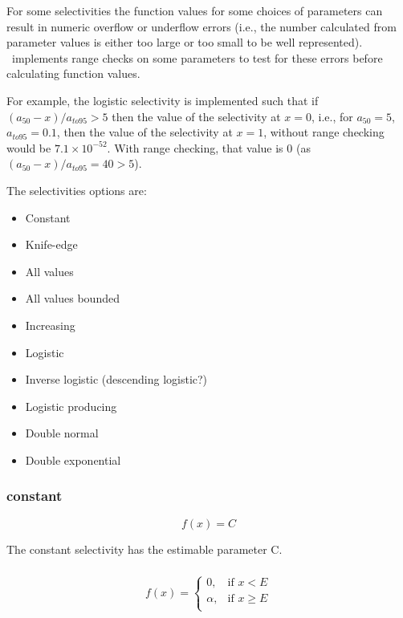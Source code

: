 For some selectivities the function values for some choices of parameters can result in numeric overflow or underflow errors (i.e., the number calculated from parameter values is either too large or too small to be well represented). \CNAME\ implements range checks on some parameters to test for these errors before calculating function values.

For example, the logistic selectivity is implemented such that if $(a_{50}-x)/a_{to95} > 5$ then the value of the selectivity at $x=0$, i.e., for $a_{50}=5$, $a_{to95}=0.1$, then the value of the selectivity at $x=1$, without range checking would be $7.1 \times 10^{-52}$. With range checking, that value is $0$ (as $(a_{50}-x)/a_{to95}=40 > 5$).

The selectivities options are:

\begin{itemize}
  \item Constant
  \item Knife-edge
  \item All values
  \item All values bounded
  \item Increasing
  \item Logistic
  \item Inverse logistic (descending logistic?)
  \item Logistic producing
  \item Double normal
  \item Double exponential
\end{itemize}

\subsubsection[Constant]{{constant}}

\begin{equation}
f(x)=C
\end{equation}

The constant selectivity has the estimable parameter C.

\subsubsection[Knife-edge]{}
\begin{equation}
f(x)= \begin{cases}
  0, & \text{if $x < E$} \\
  \alpha, & \text{if $x \ge E$}\\
  \end{cases}
\end{equation}

